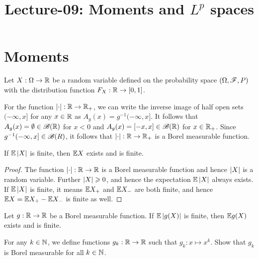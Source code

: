 \documentclass[letterpaper,10pt,english]{article}
\title{Lecture-09: Moments and $L^p$ spaces}
\begin{document}
\maketitle

\section{Moments}
Let $X:\Omega\to\mathbb{R}$ be a random variable defined on the probability space $(\Omega,\mathscr{F},P)$ with the distribution function $F_X:\mathbb{R} \to [0,1]$. 
\begin{shaded}
\begin{exmp} 
For the function $\left\lvert\cdot\right\rvert: \mathbb{R} \to \mathbb{R}_+$, 
we can write the inverse image of half open sets $(-\infty, x]$ for any $x \in \mathbb{R}$ as $A_g(x) = g^{-1}(-\infty, x]$. 
It follows that $A_g(x) = \emptyset \in \mathscr{B}(\mathbb{R})$ for $x < 0$ and $A_g(x) = [-x, x] \in \mathscr{B}(\mathbb{R})$ for $x \in \mathbb{R}_+$. 
Since $g^{-1}(-\infty, x] \in \mathscr{B}(R)$, it follows that $\left\lvert\cdot\right\rvert: \mathbb{R} \to \mathbb{R}_+$ is a Borel measurable function. 
\end{exmp}
\end{shaded}
\begin{lem} 
If $\mathbb{E}\left\lvert X\right\rvert$ is finite, then $\mathbb{E} X$ exists and is finite. 
\end{lem}
\begin{proof} 
The function $\left\lvert\cdot\right\rvert: \mathbb{R} \to \mathbb{R}$ is a Borel measurable function and hence $\left\lvert X\right\rvert$ is a random variable. 
Further $\left\lvert X\right\rvert \geqslant 0$, and hence the expectation $\mathbb{E}\left\lvert X\right\rvert$ always exists. 
If $\mathbb{E}\left\lvert X\right\rvert$ is finite, it means $\mathbb{E} X_+$ and $\mathbb{E} X_-$ are both finite, 
and hence $\mathbb{E} X = \mathbb{E} X_+ - \mathbb{E} X_-$ is finite as well.  
\end{proof}
\begin{cor} 
Let $g: \mathbb{R} \to \mathbb{R}$ be a Borel measurable function. 
If $\mathbb{E}\left\lvert g(X)\right\rvert$ is finite, then $\mathbb{E} g(X)$ exists and is finite. 
\end{cor} 
\begin{tcolorbox}
\begin{exerc} 
For any $k \in \mathbb{N}$, we define functions $g_k: \mathbb{R} \to \mathbb{R}$ such that $g_k: x \mapsto x^k$. 
Show that $g_k$ is Borel measurable for all $k \in \mathbb{N}$. 
\end{exerc} 
\end{tcolorbox}
\end{document}
